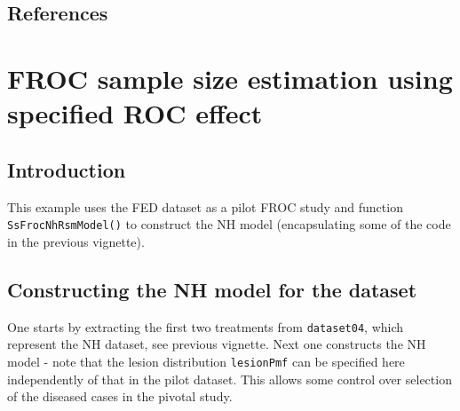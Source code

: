 \documentclass[]{book}
\newenvironment{Shaded}{\begin{snugshade}}{\end{snugshade}}
\newcommand{\DataTypeTok}[1]{\textcolor[rgb]{0.13,0.29,0.53}{#1}}
\newcommand{\DecValTok}[1]{\textcolor[rgb]{0.00,0.00,0.81}{#1}}
\newcommand{\FloatTok}[1]{\textcolor[rgb]{0.00,0.00,0.81}{#1}}
\newcommand{\KeywordTok}[1]{\textcolor[rgb]{0.13,0.29,0.53}{\textbf{#1}}}
\newcommand{\NormalTok}[1]{#1}
\newcommand{\OperatorTok}[1]{\textcolor[rgb]{0.81,0.36,0.00}{\textbf{#1}}}
\newcommand{\StringTok}[1]{\textcolor[rgb]{0.31,0.60,0.02}{#1}}
\begin{document}
\hypertarget{references-9}{%
\section{References}\label{references-9}}

\hypertarget{SSFroc2}{%
\chapter{FROC sample size estimation using specified ROC effect}\label{SSFroc2}}

\hypertarget{introduction-12}{%
\section{Introduction}\label{introduction-12}}

This example uses the FED dataset as a pilot FROC study and function \texttt{SsFrocNhRsmModel()} to construct the NH model (encapsulating some of the code in the previous vignette).

\hypertarget{constructing-the-nh-model-for-the-dataset}{%
\section{Constructing the NH model for the dataset}\label{constructing-the-nh-model-for-the-dataset}}

One starts by extracting the first two treatments from \texttt{dataset04}, which represent the NH dataset, see previous vignette. Next one constructs the NH model - note that the lesion distribution \texttt{lesionPmf} can be specified here independently of that in the pilot dataset. This allows some control over selection of the diseased cases in the pivotal study.

\begin{Shaded}
\end{Shaded}
\end{document}
